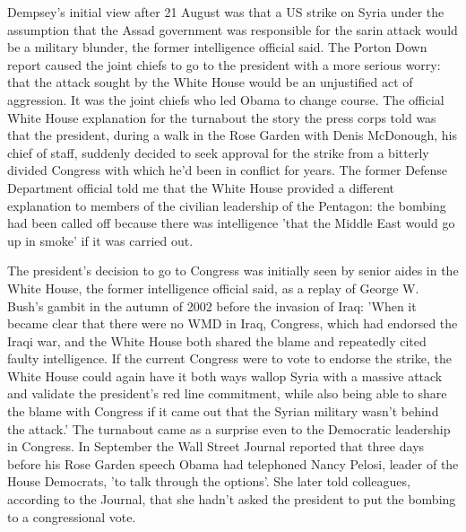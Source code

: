 Dempsey's initial view after 21 August was that a US strike on Syria
\textendash{} under the assumption that the Assad government was responsible
for the sarin attack \textendash{} would be a military blunder, the
former intelligence official said. The Porton Down report caused the
joint chiefs to go to the president with a more serious worry: that
the attack sought by the White House would be an unjustified act of
aggression. It was the joint chiefs who led Obama to change course.
The official White House explanation for the turnabout \textendash{}
the story the press corps told \textendash{} was that the president,
during a walk in the Rose Garden with Denis McDonough, his chief of
staff, suddenly decided to seek approval for the strike from a bitterly
divided Congress with which he'd been in conflict for years. The former
Defense Department official told me that the White House provided
a different explanation to members of the civilian leadership of the
Pentagon: the bombing had been called off because there was intelligence
'that the Middle East would go up in smoke' if it was carried out.

The president's decision to go to Congress was initially seen by senior
aides in the White House, the former intelligence official said, as
a replay of George W. Bush's gambit in the autumn of 2002 before the
invasion of Iraq: 'When it became clear that there were no WMD in
Iraq, Congress, which had endorsed the Iraqi war, and the White House
both shared the blame and repeatedly cited faulty intelligence. If
the current Congress were to vote to endorse the strike, the White
House could again have it both ways \textendash{} wallop Syria with
a massive attack and validate the president's red line commitment,
while also being able to share the blame with Congress if it came
out that the Syrian military wasn't behind the attack.' The turnabout
came as a surprise even to the Democratic leadership in Congress.
In September the Wall Street Journal reported that three days before
his Rose Garden speech Obama had telephoned Nancy Pelosi, leader of
the House Democrats, 'to talk through the options'. She later told
colleagues, according to the Journal, that she hadn't asked the president
to put the bombing to a congressional vote.

